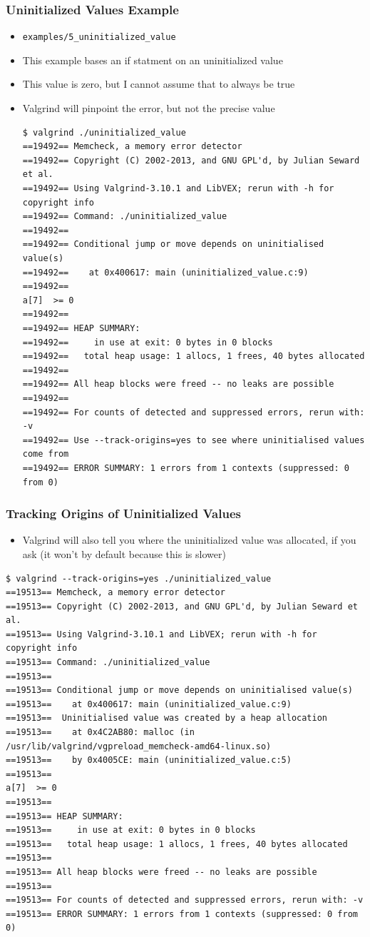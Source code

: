 \documentclass{beamer}
\begin{document}
\begin{frame}[fragile]
\frametitle{Uninitialized Values Example}
\begin{itemize}
\item \texttt{examples/5\_uninitialized\_value}
\item This example bases an if statment on an uninitialized value
\item This value is zero, but I cannot assume that to always be true
\item Valgrind will pinpoint the error, but not the precise value
\begin{lstlisting}
$ valgrind ./uninitialized_value
==19492== Memcheck, a memory error detector
==19492== Copyright (C) 2002-2013, and GNU GPL'd, by Julian Seward et al.
==19492== Using Valgrind-3.10.1 and LibVEX; rerun with -h for copyright info
==19492== Command: ./uninitialized_value
==19492==
==19492== Conditional jump or move depends on uninitialised value(s)
==19492==    at 0x400617: main (uninitialized_value.c:9)
==19492==
a[7]  >= 0
==19492==
==19492== HEAP SUMMARY:
==19492==     in use at exit: 0 bytes in 0 blocks
==19492==   total heap usage: 1 allocs, 1 frees, 40 bytes allocated
==19492==
==19492== All heap blocks were freed -- no leaks are possible
==19492==
==19492== For counts of detected and suppressed errors, rerun with: -v
==19492== Use --track-origins=yes to see where uninitialised values come from
==19492== ERROR SUMMARY: 1 errors from 1 contexts (suppressed: 0 from 0)
\end{lstlisting}
\end{itemize}
\end{frame}

\begin{frame}[fragile]
  \frametitle{Tracking Origins of Uninitialized Values}
  \begin{itemize}
    \item Valgrind will also tell you where the uninitialized value was allocated, if you ask (it won't by default because this is slower)
  \end{itemize}
  \begin{lstlisting}
$ valgrind --track-origins=yes ./uninitialized_value
==19513== Memcheck, a memory error detector
==19513== Copyright (C) 2002-2013, and GNU GPL'd, by Julian Seward et al.
==19513== Using Valgrind-3.10.1 and LibVEX; rerun with -h for copyright info
==19513== Command: ./uninitialized_value
==19513==
==19513== Conditional jump or move depends on uninitialised value(s)
==19513==    at 0x400617: main (uninitialized_value.c:9)
==19513==  Uninitialised value was created by a heap allocation
==19513==    at 0x4C2AB80: malloc (in /usr/lib/valgrind/vgpreload_memcheck-amd64-linux.so)
==19513==    by 0x4005CE: main (uninitialized_value.c:5)
==19513==
a[7]  >= 0
==19513==
==19513== HEAP SUMMARY:
==19513==     in use at exit: 0 bytes in 0 blocks
==19513==   total heap usage: 1 allocs, 1 frees, 40 bytes allocated
==19513==
==19513== All heap blocks were freed -- no leaks are possible
==19513==
==19513== For counts of detected and suppressed errors, rerun with: -v
==19513== ERROR SUMMARY: 1 errors from 1 contexts (suppressed: 0 from 0)
  \end{lstlisting}
\end{frame}
\end{document}
